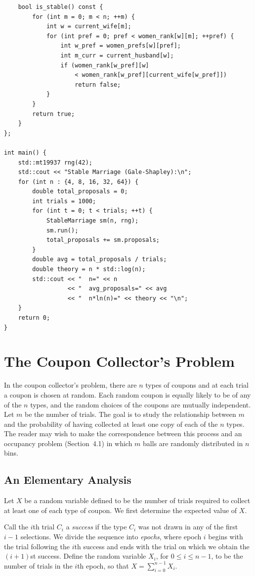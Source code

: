 \documentclass[twoside,12pt]{book}
\theoremstyle{plain}
\theoremstyle{definition}
\theoremstyle{remark}
\newenvironment{cpplisting}{\begin{center}\small}{\end{center}}
\begin{document}
\begin{cpplisting}
\begin{lstlisting}
    bool is_stable() const {
        for (int m = 0; m < n; ++m) {
            int w = current_wife[m];
            for (int pref = 0; pref < women_rank[w][m]; ++pref) {
                int w_pref = women_prefs[w][pref];
                int m_curr = current_husband[w];
                if (women_rank[w_pref][w]
                    < women_rank[w_pref][current_wife[w_pref]])
                    return false;
            }
        }
        return true;
    }
};

int main() {
    std::mt19937 rng(42);
    std::cout << "Stable Marriage (Gale-Shapley):\n";
    for (int n : {4, 8, 16, 32, 64}) {
        double total_proposals = 0;
        int trials = 1000;
        for (int t = 0; t < trials; ++t) {
            StableMarriage sm(n, rng);
            sm.run();
            total_proposals += sm.proposals;
        }
        double avg = total_proposals / trials;
        double theory = n * std::log(n);
        std::cout << "  n=" << n
                  << "  avg_proposals=" << avg
                  << "  n*ln(n)=" << theory << "\n";
    }
    return 0;
}
\end{lstlisting}
\end{cpplisting}

\section{The Coupon Collector's Problem}
\label{sec:coupon}

In the coupon collector's problem, there are $n$ types of coupons and at each trial a coupon is chosen at random. Each random coupon is equally likely to be of any of the $n$ types, and the random choices of the coupons are mutually independent. Let $m$ be the number of trials. The goal is to study the relationship between $m$ and the probability of having collected at least one copy of each of the $n$ types. The reader may wish to make the correspondence between this process and an occupancy problem (Section~4.1) in which $m$ balls are randomly distributed in $n$ bins.

\subsection{An Elementary Analysis}

Let $X$ be a random variable defined to be the number of trials required to collect at least one of each type of coupon. We first determine the expected value of $X$.

Call the $i$th trial $C_i$ a \emph{success} if the type $C_i$ was not drawn in any of the first $i-1$ selections. We divide the sequence into \emph{epochs}, where epoch $i$ begins with the trial following the $i$th success and ends with the trial on which we obtain the $(i+1)$st success. Define the random variable $X_i$, for $0 \leq i \leq n-1$, to be the number of trials in the $i$th epoch, so that $X = \sum_{i=0}^{n-1} X_i$.
\end{document}
